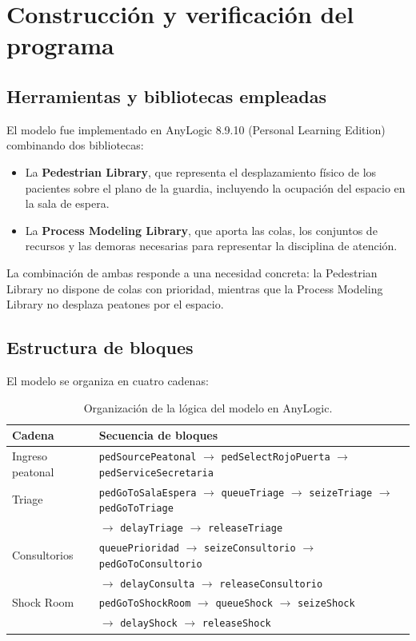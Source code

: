 \section{Construcción y verificación del programa}

\subsection{Herramientas y bibliotecas empleadas}

El modelo fue implementado en AnyLogic 8.9.10 (Personal Learning Edition)
combinando dos bibliotecas:

\begin{itemize}
  \item La \textbf{Pedestrian Library}, que representa el desplazamiento
  físico de los pacientes sobre el plano de la guardia, incluyendo la
  ocupación del espacio en la sala de espera.
  \item La \textbf{Process Modeling Library}, que aporta las colas, los
  conjuntos de recursos y las demoras necesarias para representar la
  disciplina de atención.
\end{itemize}

La combinación de ambas responde a una necesidad concreta: la Pedestrian
Library no dispone de colas con prioridad, mientras que la Process Modeling
Library no desplaza peatones por el espacio.

\subsection{Estructura de bloques}

El modelo se organiza en cuatro cadenas:

\begin{table}[H]
\centering
\small
\begin{tabular}{ll}
\toprule
\textbf{Cadena} & \textbf{Secuencia de bloques} \\
\midrule
Ingreso peatonal &
  \texttt{pedSourcePeatonal} $\rightarrow$ \texttt{pedSelectRojoPuerta}
  $\rightarrow$ \texttt{pedServiceSecretaria} \\
Triage &
  \texttt{pedGoToSalaEspera} $\rightarrow$ \texttt{queueTriage} $\rightarrow$
  \texttt{seizeTriage} $\rightarrow$ \texttt{pedGoToTriage} \\
 & $\rightarrow$ \texttt{delayTriage} $\rightarrow$ \texttt{releaseTriage} \\
Consultorios &
  \texttt{queuePrioridad} $\rightarrow$ \texttt{seizeConsultorio} $\rightarrow$
  \texttt{pedGoToConsultorio} \\
 & $\rightarrow$ \texttt{delayConsulta} $\rightarrow$ \texttt{releaseConsultorio} \\
Shock Room &
  \texttt{pedGoToShockRoom} $\rightarrow$ \texttt{queueShock} $\rightarrow$
  \texttt{seizeShock} \\
 & $\rightarrow$ \texttt{delayShock} $\rightarrow$ \texttt{releaseShock} \\
\bottomrule
\end{tabular}
\caption{Organización de la lógica del modelo en AnyLogic.}
\end{table}

